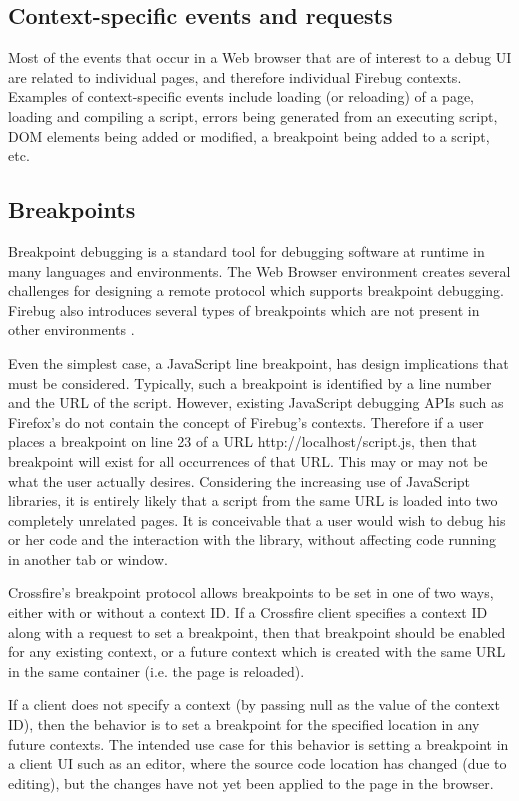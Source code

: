 \subsection {Context-specific events and requests}
Most of the events that occur in a Web browser that are of interest to a debug
UI are related to individual pages, and therefore individual Firebug contexts.
Examples of context-specific events include loading (or reloading) of a page,
loading and compiling a script, errors being generated from an executing script,
DOM elements being added or modified, a breakpoint being added to a script, etc.

\subsection {Breakpoints}
Breakpoint debugging is a standard tool for debugging software at runtime in
many languages and environments. The Web Browser environment creates several
challenges for designing a remote protocol which supports breakpoint debugging.
Firebug also introduces several types of breakpoints which are not present in
other environments \cite{jjb-www2010}.

Even the simplest case, a JavaScript line breakpoint, has design implications
that must be considered. Typically, such a breakpoint is identified by a line
number and the URL of the script. However, existing JavaScript debugging APIs
such as Firefox's do not contain the concept of Firebug's contexts.  Therefore
if a user places a breakpoint on line 23 of a URL http://localhost/script.js,
then that breakpoint will exist for all occurrences of that URL. This may or may
not be what the user actually desires.  Considering the increasing use of
JavaScript libraries, it is entirely likely that a script from the same URL is
loaded into two completely unrelated pages. It is conceivable that a user would
wish to debug his or her code and the interaction with the library, without
affecting code running in another tab or window.

Crossfire's breakpoint protocol allows breakpoints to be set in one of two ways,
either with or without a context ID. If a Crossfire client specifies a context
ID along with a request to set a breakpoint, then that breakpoint should be
enabled for any existing context, or a future context which is created with the
same URL in the same container (i.e. the page is reloaded).

If a client does not specify a context (by passing null as the value of the
context ID), then the behavior is to set a breakpoint for the specified location
in any future contexts. The intended use case for this behavior is setting a
breakpoint in a client UI such as an editor, where the source code location has
changed (due to editing), but the changes have not yet been applied to the page
in the browser.

